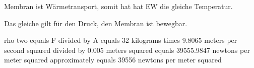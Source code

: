 Membran ist Wärmetransport, somit hat hat EW die gleiche Temperatur.

Das gleiche gilt für den Druck, den Membran ist bewegbar.

rho two equals F divided by A equals 32 kilograms times 9.8065 meters per second squared divided by 0.005 meters squared equals 39555.9847 newtons per meter squared approximately equals 39556 newtons per meter squared